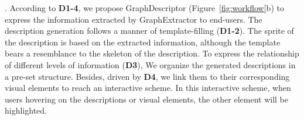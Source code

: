 . According to \textbf{D1-4}, we propose GraphDescriptor (Figure~\ref{fig:workflow}b) to express the information extracted by GraphExtractor to end-users. 
The description generation follows a manner of template-filling (\textbf{D1-2}). The sprite of the description is based on the extracted information, although the template bears a resemblance to the skeleton of the description.
To express the relationship of different levels of information (\textbf{D3}), We organize the generated descriptions in a pre-set structure. Besides, driven by \textbf{D4}, we link them to their corresponding visual elements to reach an interactive scheme. In this interactive scheme, when users hovering on the descriptions or visual elements, the other element will be highlighted.






